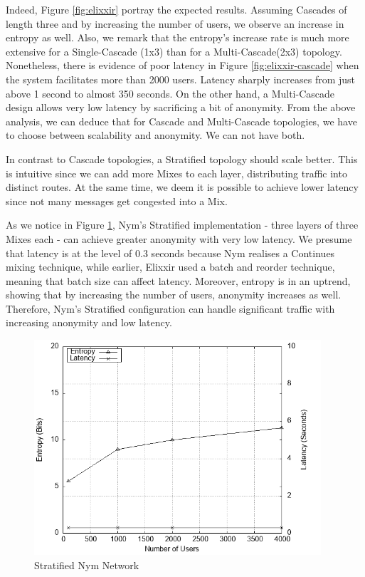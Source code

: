 \documentclass[logo,msc,cyber]{infthesis}   %
\begin{document}
 Indeed, Figure \ref{fig:elixxir} portray the expected results. Assuming
 Cascades of length three and by increasing the number of users, we observe an
 increase in entropy as well. Also, we remark that the entropy's increase rate
 is much more extensive for a Single-Cascade (1x3) than for a Multi-Cascade(2x3)
 topology. Nonetheless, there is evidence of poor latency in Figure
 \ref{fig:elixxir-cascade} when the system facilitates more than 2000 users.
 Latency sharply increases from just above 1 second to almost 350 seconds. On
 the other hand, a Multi-Cascade design allows very low latency by sacrificing a
 bit of anonymity. From the above analysis, we can deduce that for Cascade and
 Multi-Cascade topologies, we have to choose between scalability and anonymity.
 We can not have both.

 In contrast to Cascade topologies, a Stratified topology should scale better.
 This is intuitive since we can add more Mixes to each layer, distributing
 traffic into distinct routes. At the same time, we deem it is possible to
 achieve lower latency since not many messages get congested into a Mix. 

 As we notice in Figure \ref{fig:nym-stratified}, Nym's Stratified
 implementation - three layers of three Mixes each - can achieve greater anonymity with
 very low latency. We presume that latency is at the level of 0.3 seconds
 because Nym realises a Continues mixing technique, while earlier, Elixxir used
 a batch and reorder technique, meaning that batch size can affect latency.
 Moreover, entropy is in an uptrend, showing that by increasing the number of
 users, anonymity increases as well. Therefore, Nym's Stratified configuration
 can handle significant traffic with increasing anonymity and low latency.

\begin{figure}[h!]
    \centering
    \includegraphics[height=8cm]{figures/simulator/2.png}
    \caption{Stratified Nym Network}
    \label{fig:nym-stratified}
 \end{figure}
\end{document}
